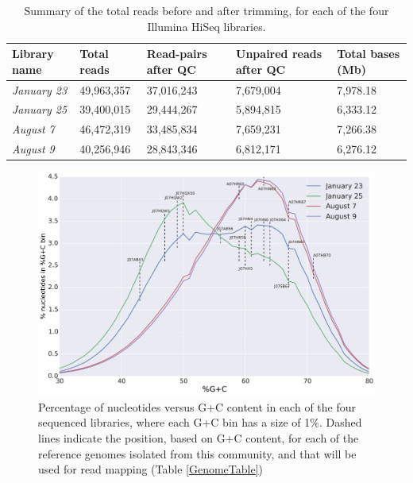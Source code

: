 \begin{table}[hbt]
  \caption{Summary of the total reads before and after trimming, for each of the four Illumina HiSeq libraries.}
  \begin{tabularx}{\textwidth}{L{2.2cm}R{2cm}R{3cm}R{3.2cm}R{2cm}}
  \hline
    \textbf{Library name} & \textbf{Total reads} & \textbf{Read-pairs after QC} & \textbf{Unpaired reads after QC} & \textbf{Total bases (Mb)} \\
    \hline 
    \textit{January 23} & 49,963,357 & 37,016,243 & 7,679,004 & 7,978.18\\
    \textit{January 25} & 39,400,015 & 29,444,267 & 5,894,815 & 6,333.12 \\
    \textit{August 7} & 46,472,319 & 33,485,834 & 7,659,231 & 7,266.38 \\
    \textit{August 9} & 40,256,946 & 28,843,346 & 6,812,171 & 6,276.12 \\
  \end{tabularx}
  \label{LibSequenceQC}
\end{table}

\begin{figure}[!hbtp]
  \centering
  \includegraphics[width=\textwidth]{Chapter5/Figures/GC_content_HiSeqLibs.pdf}
  \caption{Percentage of nucleotides versus G+C content in each of the four sequenced libraries, where each G+C bin has a size of 1\%. Dashed lines indicate the position, based on G+C content, for each of the reference genomes isolated from this community, and that will be used for read mapping (Table \ref{GenomeTable})}
  \label{ReadsGCplot}
\end{figure}

